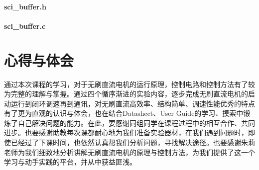 \documentclass[a4paper,11pt]{ctexart}
\begin{document}
\begin{spacing}{1.5}
\paragraph{sci\_buffer.h}
\begin{spacing}{1}
	
\end{spacing}
\paragraph{sci\_buffer.c}
\begin{spacing}{1}
	
\end{spacing}

\end{spacing}

\section*{心得与体会}
\par
通过本次课程的学习，对于无刷直流电机的运行原理，控制电路和控制方法有了较为完整的理解与掌握。通过四个循序渐进的实验内容，逐步完成无刷直流电机的启动运行到闭环调速再到通讯，对无刷直流高效率、结构简单、调速性能优秀的特点有了更为直观的认识与体会，也在结合Datasheet、User Guide的学习、摸索中锻炼了自己解决问题的能力。在此，要感谢同组同学在课程过程中的相互合作、共同进步。也要感谢助教每次课都耐心地为我们准备实验器材，在我们遇到问题时，即使已经过了下课时间，也依然认真帮我们分析问题，寻找解决途径。也要感谢朱莉老师为我们细致地分析讲解无刷直流电机的原理与控制方法，为我们提供了这一个学习与动手实践的平台，并从中获益匪浅。


	
\end{document}
